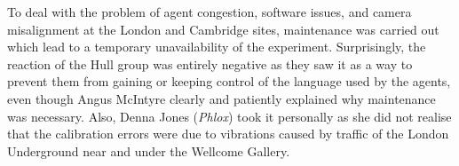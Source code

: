 To deal with the problem of agent congestion, software issues, and camera misalignment at the London 
and Cambridge sites, maintenance was carried out which lead to a temporary unavailability of the experiment. 
Surprisingly, the reaction of the Hull group was entirely negative as they saw it as a 
way to prevent them from gaining or keeping control of the language used by the agents, even though 
Angus McIntyre clearly and patiently explained why maintenance was necessary. Also, Denna Jones ({\it Phlox}) took 
it personally as she did not realise that the calibration errors were due to vibrations caused by
traffic of the London Underground near and under the Wellcome Gallery.  \\


\begin{mail}


\end{mail}
